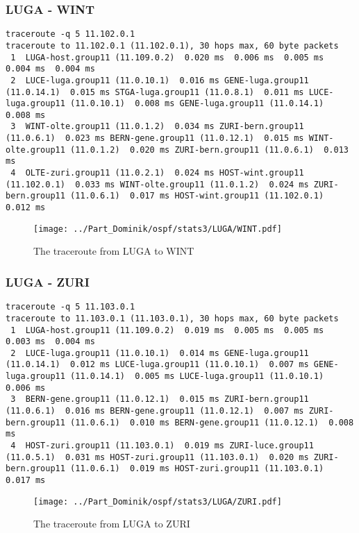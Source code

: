 \subsubsection{LUGA - WINT}
\begin{lstlisting}
traceroute -q 5 11.102.0.1
traceroute to 11.102.0.1 (11.102.0.1), 30 hops max, 60 byte packets
 1  LUGA-host.group11 (11.109.0.2)  0.020 ms  0.006 ms  0.005 ms  0.004 ms  0.004 ms
 2  LUCE-luga.group11 (11.0.10.1)  0.016 ms GENE-luga.group11 (11.0.14.1)  0.015 ms STGA-luga.group11 (11.0.8.1)  0.011 ms LUCE-luga.group11 (11.0.10.1)  0.008 ms GENE-luga.group11 (11.0.14.1)  0.008 ms
 3  WINT-olte.group11 (11.0.1.2)  0.034 ms ZURI-bern.group11 (11.0.6.1)  0.023 ms BERN-gene.group11 (11.0.12.1)  0.015 ms WINT-olte.group11 (11.0.1.2)  0.020 ms ZURI-bern.group11 (11.0.6.1)  0.013 ms
 4  OLTE-zuri.group11 (11.0.2.1)  0.024 ms HOST-wint.group11 (11.102.0.1)  0.033 ms WINT-olte.group11 (11.0.1.2)  0.024 ms ZURI-bern.group11 (11.0.6.1)  0.017 ms HOST-wint.group11 (11.102.0.1)  0.012 ms
\end{lstlisting}
\begin{figure}[H]
\centering
\texttt{[image: ../Part\_Dominik/ospf/stats3/LUGA/WINT.pdf]}
\caption{The traceroute from LUGA to WINT}
\end{figure}
\clearpage
\subsubsection{LUGA - ZURI}
\begin{lstlisting}
traceroute -q 5 11.103.0.1
traceroute to 11.103.0.1 (11.103.0.1), 30 hops max, 60 byte packets
 1  LUGA-host.group11 (11.109.0.2)  0.019 ms  0.005 ms  0.005 ms  0.003 ms  0.004 ms
 2  LUCE-luga.group11 (11.0.10.1)  0.014 ms GENE-luga.group11 (11.0.14.1)  0.012 ms LUCE-luga.group11 (11.0.10.1)  0.007 ms GENE-luga.group11 (11.0.14.1)  0.005 ms LUCE-luga.group11 (11.0.10.1)  0.006 ms
 3  BERN-gene.group11 (11.0.12.1)  0.015 ms ZURI-bern.group11 (11.0.6.1)  0.016 ms BERN-gene.group11 (11.0.12.1)  0.007 ms ZURI-bern.group11 (11.0.6.1)  0.010 ms BERN-gene.group11 (11.0.12.1)  0.008 ms
 4  HOST-zuri.group11 (11.103.0.1)  0.019 ms ZURI-luce.group11 (11.0.5.1)  0.031 ms HOST-zuri.group11 (11.103.0.1)  0.020 ms ZURI-bern.group11 (11.0.6.1)  0.019 ms HOST-zuri.group11 (11.103.0.1)  0.017 ms
\end{lstlisting}
\begin{figure}[H]
\centering
\texttt{[image: ../Part\_Dominik/ospf/stats3/LUGA/ZURI.pdf]}
\caption{The traceroute from LUGA to ZURI}
\end{figure}
\clearpage
